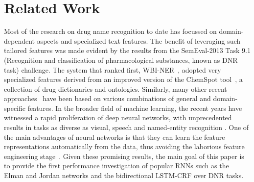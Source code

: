 \documentclass[11pt,letterpaper]{article}
\begin{document}
\section{Related Work}
Most of the research on drug name recognition to date has focussed on domain-dependent aspects and specialized text features. The benefit of leveraging such tailored features was made evident by the results from the SemEval-2013 Task 9.1 (Recognition and classification of pharmacological substances, known as DNR task) challenge. The system that ranked first, WBI-NER~\cite{huber2013wbi}, adopted very specialized features derived from an improved version of the ChemSpot tool~\cite{rocktaschel2012chemspot}, a collection of drug dictionaries and ontologies. Similarly, many other recent approaches~\cite{abacha2015text,liu2015feature,segura2015exploring} have been based on various combinations of general and domain-specific features. In the broader field of machine learning, the recent years have witnessed a rapid proliferation of deep neural networks, with unprecedented results in tasks as diverse as visual, speech and named-entity recognition \cite{hinton2012deep,krizhevsky2012imagenet,lample2016neural}. One of the main advantages of neural networks is that they can learn the feature representations automatically from the data, thus avoiding the laborious feature engineering stage~\cite{mesnil2015using,lample2016neural}. Given these promising results, the main goal of this paper is to provide the first performance investigation of popular RNNs such as the Elman and Jordan networks and the bidirectional LSTM-CRF over DNR tasks.

\begin{table*}[ht]
	\small
	\centering
		\caption{Example sentence in a DNR task with entity classes represented in IOB format.}
		\label{table1} 
\end{table*}
	
\end{document}
